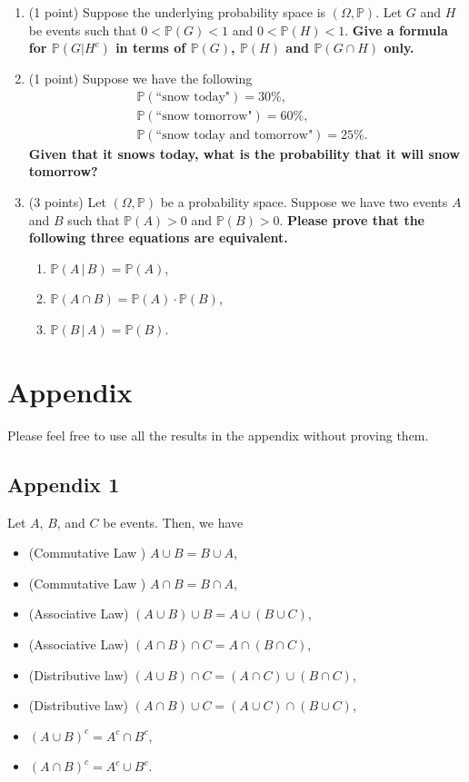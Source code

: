\documentclass[11pt]{article}
\begin{document}
\begin{enumerate}
\item (1 point) Suppose the underlying probability space is $(\Omega,\mathbb{P})$. Let $G$ and $H$ be events such that $0<\mathbb{P}(G)<1$ and $0<\mathbb{P}(H)<1$. \textbf{Give a formula for $\mathbb{P}(G|H^c)$ in terms of $\mathbb{P}(G)$, $\mathbb{P}(H)$ and $\mathbb{P}(G\cap H)$ only.}


\item (1 point) Suppose we have the following
\begin{align*}
    & \mathbb{P}(\text{``snow today"})=30\%, \\
    & \mathbb{P}(\text{``snow tomorrow"})=60\%, \\
    & \mathbb{P}(\text{``snow today and tomorrow"})=25\%.
\end{align*}
\textbf{Given that it snows today, what is the probability that it will snow tomorrow?}


\item (3 points) Let $(\Omega,\mathbb{P})$ be a probability space. Suppose we have two events $A$ and $B$ such that $\mathbb{P}(A)>0$ and $\mathbb{P}(B)>0$. \textbf{Please prove that the following three equations are equivalent.}
    \begin{enumerate}
        \item $\mathbb{P}(A\,\vert\,B)=\mathbb{P}(A)$,
        \item $\mathbb{P}(A\cap B)=\mathbb{P}(A)\cdot \mathbb{P}(B)$,
        \item $\mathbb{P}(B\,\vert\,A)=\mathbb{P}(B)$.
    \end{enumerate}

\end{enumerate}


\newpage

\section{Appendix}

Please feel free to use all the results in the appendix without proving them.

\subsection{Appendix 1}

Let $A$, $B$, and $C$ be events. Then, we have
\begin{itemize}
\item (Commutative Law ) $A\cup B=B\cup A$,
\item (Commutative Law ) $A\cap B= B\cap A$,
\item (Associative Law) $(A\cup B)\cup B=A\cup (B\cup C)$,
\item (Associative Law) $(A\cap B)\cap C= A\cap(B\cap C)$,
\item (Distributive law) $(A\cup B)\cap C=(A\cap C)\cup (B\cap C)$,
\item (Distributive law) $(A\cap B)\cup C=(A\cup C)\cap (B\cup C)$,
\item $ (A\cup B)^c=A^c\cap B^c$,
\item $ (A\cap B)^c=A^c\cup B^c$.
\end{itemize}
\end{document}
